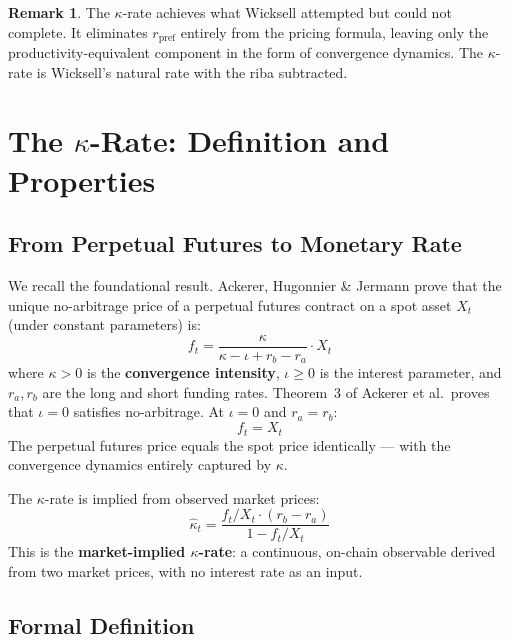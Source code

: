 \documentclass[10pt,twocolumn]{article}
\theoremstyle{plain}
\theoremstyle{definition}
\newtheorem{remark}{Remark}
\begin{document}
\begin{remark}
The $\kappa$-rate achieves what Wicksell attempted but could
not complete. It eliminates $r_{\text{pref}}$ entirely from
the pricing formula, leaving only the productivity-equivalent
component in the form of convergence dynamics.
The $\kappa$-rate is Wicksell's natural rate with
the riba subtracted.
\end{remark}

\section{The $\kappa$-Rate: Definition and Properties}
\label{sec:kappa_def}

\subsection{From Perpetual Futures to Monetary Rate}

We recall the foundational result. Ackerer, Hugonnier \& Jermann
\cite{Ackerer2024} prove that the unique no-arbitrage price of a
perpetual futures contract on a spot asset $X_t$ (under constant
parameters) is:
\begin{equation}
f_t = \frac{\kappa}{\kappa - \iota + r_b - r_a} \cdot X_t
\label{eq:perp_price}
\end{equation}
where $\kappa > 0$ is the \textbf{convergence intensity}, $\iota
\geq 0$ is the interest parameter, and $r_a, r_b$ are the
long and short funding rates. Theorem~3 of Ackerer et al.\
proves that $\iota = 0$ satisfies no-arbitrage. At $\iota = 0$
and $r_a = r_b$:
\begin{equation}
f_t = X_t
\label{eq:parity}
\end{equation}
The perpetual futures price equals the spot price identically
--- with the convergence dynamics entirely captured by $\kappa$.

The $\kappa$-rate is implied from observed market prices:
\begin{equation}
\boxed{\hat\kappa_t = \frac{f_t/X_t \cdot (r_b - r_a)}{1 - f_t/X_t}}
\label{eq:kappa_implied}
\end{equation}
This is the \textbf{market-implied $\kappa$-rate}: a continuous,
on-chain observable derived from two market prices, with no
interest rate as an input.

\subsection{Formal Definition}
\end{document}
